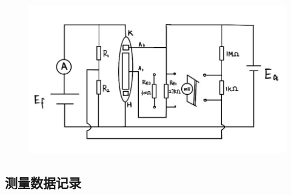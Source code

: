 \documentclass[UTF8]{ctexart}
\begin{document}
\begin{figure}[H]
  \centering
  \includegraphics[scale=1]{电路图.jpg}
\end{figure}


\subsection{测量数据记录}
\end{document}

